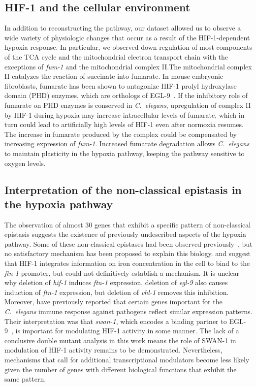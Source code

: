 \documentclass[9pt,twocolumn,twoside]{pnas-new}
\newcommand{\cel}{\emph{C.~elegans}}
\newcommand{\gene}[1]{\emph{#1}}
\newcommand{\ftna}{\emph{\mbox{ftn-1}}}
\newcommand{\eglp}{EGL-9}
\newcommand{\hifp}{HIF-1}
\begin{document}
\subsection*{\hifp{} and the cellular environment}

In addition to reconstructing the pathway, our dataset allowed us
to observe a wide variety of physiologic changes that occur as a result of the
\hifp{}-dependent hypoxia response. In particular, we observed down-regulation of most
components of the TCA cycle and the mitochondrial electron transport chain with
the exceptions of \gene{fum-1} and the mitochondrial complex II.\@ The mitochondrial
complex II catalyzes the reaction of succinate into fumarate.
In mouse embryonic fibroblasts, fumarate has been
shown to antagonize \hifp{} prolyl hydroxylase domain (PHD) enzymes, which are
orthologs of \eglp{}~\cite{Sudarshan2009}.
If the inhibitory role of fumarate on PHD enzymes is conserved in \cel{},
upregulation of complex II by \hifp{} during hypoxia may increase
intracellular levels of fumarate, which in turn could lead to artificially high
levels of \hifp{}
even after normoxia resumes. The increase in fumarate produced by the complex
could be compensated by increasing expression of \gene{fum-1}. Increased fumarate
degradation allows \cel{} to maintain plasticity in the hypoxia pathway, keeping
the pathway sensitive to oxygen levels.

\subsection*{Interpretation of the non-classical epistasis in the hypoxia pathway}
The observation of almost 30 genes that exhibit a specific pattern of non-classical
epistasis suggests the existence of previously undescribed aspects of the hypoxia
pathway. Some of these non-classical epistases had been observed
previously~\cite{Ackerman2012,Romney2011,Luhachack2012}, but
no satisfactory mechanism has been proposed to explain this biology.
\citep{Romney2011} and \citep{Ackerman2012}
suggest that \hifp{} integrates information on iron concentration in the
cell to bind to the \ftna{} promoter, but could not definitively establish
a mechanism.
It is unclear why deletion of \gene{hif-1} induces \ftna{}
expression, deletion of \gene{egl-9} also causes induction of \ftna{} expression,
but deletion of \gene{vhl-1} removes this inhibition. Moreover, \citep{Luhachack2012}
have previously reported that certain genes important for the \cel{} immune response
against pathogens reflect similar expression patterns. Their interpretation
was that \gene{swan-1}, which encodes a binding partner to \eglp{}~\cite{Shao2010},
is important for modulating \hifp{} activity in some manner. The lack of a
conclusive double mutant analysis in this work means the role of SWAN-1 in
modulation of \hifp{} activity remains to be demonstrated. Nevertheless, mechanisms
that call for additional transcriptional modulators become less likely given the
number of genes with different biological functions that exhibit the same pattern.
\end{document}
